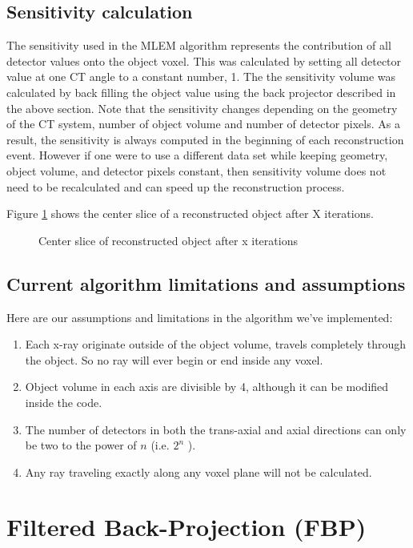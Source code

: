 \subsection{Sensitivity calculation}
The sensitivity used in the MLEM algorithm represents the contribution of all detector values onto the object voxel.  This was calculated by setting all detector value at one CT angle to a constant number, 1.  The the sensitivity volume was calculated by back filling the object value using the back projector described in the above section.  Note that the sensitivity changes depending on the geometry of the CT system, number of object volume and number of detector pixels.  As a result, the sensitivity is always computed in the beginning of each reconstruction event.  However if one were to use a different data set while keeping geometry, object volume, and detector pixels constant, then sensitivity volume does not need to be recalculated and can speed up the reconstruction process.

Figure \ref{fig:reconstructedimage} shows the center slice of a reconstructed object after X iterations.

\begin{figure}
\centering
{}
\label{fig:reconstructedimage}
\caption{Center slice of reconstructed object after x iterations}
\end{figure}

\subsection{Current algorithm limitations and assumptions}
Here are our assumptions and limitations in the algorithm we've implemented:
\begin{enumerate}
\item Each x-ray originate outside of the object volume, travels completely through the object.  So no ray will ever begin or end inside any voxel.
\item Object volume in each axis are divisible by 4, although it can be modified inside the code.
\item The number of detectors in both the trans-axial and axial directions can only be two to the power of $n$ (i.e. $2^n$ ).
\item Any ray traveling exactly along any voxel plane will not be calculated.
\end{enumerate}




\section{Filtered Back-Projection (FBP) }



